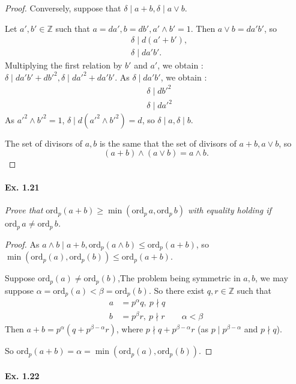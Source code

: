 \documentclass[11pt,a4paper]{article}
\newcommand{\Z}{\mathbb{Z}}
\newcommand{\ord}{\mathrm{ord}}
\begin{document}
{\begin{proof}
 Conversely, suppose that $\delta \mid a+b, \delta \mid a \vee b$.
 
 Let $a',b' \in \Z$ such that $a = da',b = db', a' \wedge b' = 1$. Then $a \vee b = da'b'$, so 
 \begin{align*}
& \delta \mid d(a'+b'),\\
 &\delta \mid da'b'.
 \end{align*}
 Multiplying the first relation by $b'$ and $a'$, we obtain : 
 $\delta \mid da'b' +db'^2, \delta \mid da'^2 +da'b'$. As $\delta \mid da'b'$, we obtain :
 \begin{align*}
 & \delta \mid d b'^2\\
 &\delta \mid d a'^2
 \end{align*}
 As $a'^2\wedge b'^2 = 1$, $\delta \mid d(a'^2 \wedge b'^2) =d$, so $\delta \mid a, \delta \mid b$.

The set of divisors of $a,b$ is the same that the set of divisors of $a+b,a\vee b$, so
$$(a+b ) \wedge( a \vee b) = a \wedge b.$$
\end{proof}

\paragraph{Ex. 1.21}

{\it Prove that $\ord_p(a+b) \geq \min(\ord_p \,a,\ord_p\, b )$ with equality holding if $\ord_p\, a \neq \ord_p\, b$.
}

\begin{proof}
As $a\wedge b \mid a + b, \ord_p(a\wedge b) \leq \ord_p(a+b)$, so $\min(\ord_p(a),\ord_p(b)) \leq \ord_p(a+b)$.

Suppose $\ord_p(a) \neq \ord_p(b)$,The problem being symmetric in $a,b$, we may suppose $\alpha = \ord_p(a) < \beta = \ord_p(b)$.
So there exist $q,r \in \Z$ such that
\begin{align*}
a &= p^\alpha q, \ p \nmid q\\
b &= p^\beta r, \ p\nmid r \qquad \alpha < \beta
\end{align*}
Then $a+b = p^\alpha(q+ p^{\beta-\alpha} r)$, where $p\nmid q + p^{\beta-\alpha}r $ (as $p \mid p^{\beta - \alpha}$ and $ p \nmid q$).

So $\ord_p(a+b) = \alpha = \min(\ord_p(a), \ord_p(b))$.
\end{proof}

\paragraph{Ex. 1.22}

}
\end{document}
